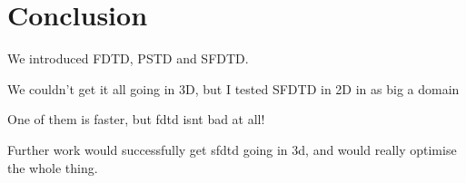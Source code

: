 %
%
%
\chapter*{Conclusion}
We introduced FDTD, PSTD and SFDTD.

We couldn't get it all going in 3D, but I tested SFDTD in 2D in as big a domain

One of them is faster, but fdtd isnt bad at all!

Further work would successfully get sfdtd going in 3d, and would really optimise the whole thing.


